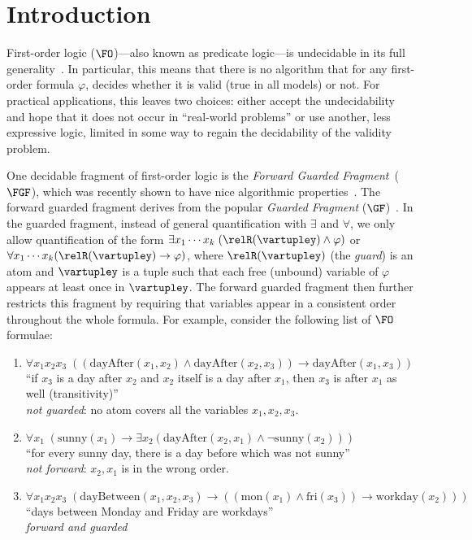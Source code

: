 \chapter{Introduction}\label{chap:introduction}

First-order logic ($\FO$)---also known as predicate logic---is undecidable in its full generality~\cite[Sec. 1.1]{borger1997}.
In particular, this means that there is no algorithm that for any first-order formula $\varphi$, decides whether it is valid (true in all models) or not.
For practical applications, this leaves two choices: either accept the undecidability and hope that it does not occur in ``real-world problems'' or use another, less expressive logic, limited in some way to regain the decidability of the validity problem.

One decidable fragment of first-order logic is the \emph{Forward Guarded Fragment}~($\FGF$), which was recently shown to have nice algorithmic properties~\cite{Bednarczyk21}.
The forward guarded fragment derives from the popular \emph{Guarded Fragment} ($\GF$)~\cite{AndrekaNB98}.
In the guarded fragment, instead of general quantification with $\exists$ and $\forall$, we only allow quantification of the form $\exists{x_{1}\cdots{}x_{k}}\; (\relR(\vartupley) \land \varphi)$ or $\forall{x_{1}\cdots{}x_{k}} (\relR(\vartupley) \to \varphi)$, where $\relR(\vartupley)$ (the \emph{guard}) is an atom and $\vartupley$ is a tuple such that each free (unbound) variable of $\varphi$ appears at least once in $\vartupley$.
The forward guarded fragment then further restricts this fragment by requiring that variables appear in a consistent order throughout the whole formula.
For example, consider the following list of $\FO$ formulae:
\begin{enumerate}
  \item $\forall{x_{1}x_{2}x_{3}}\; ((\mathrm{dayAfter}(x_{1},x_{2}) \land \mathrm{dayAfter}(x_{2},x_{3})) \to \mathrm{dayAfter}(x_{1}, x_{3}))$ \\
        ``if $x_{3}$ is a day after $x_{2}$ and $x_{2}$ itself is a day after $x_{1}$, then $x_{3}$ is after $x_{1}$ as well (transitivity)'' \\
        \emph{not guarded}: no atom covers all the variables $x_{1}, x_{2}, x_{3}$.
  \item $\forall{x_{1}}\; (\mathrm{sunny}(x_{1}) \to \exists{x_{2}} (\mathrm{dayAfter}(x_{2},x_{1}) \land \neg \mathrm{sunny}(x_{2})))$ \\
        ``for every sunny day, there is a day before which was not sunny'' \\
        \emph{not forward}: $x_{2}, x_{1}$ is in the wrong order.
  \item $\forall{x_{1}x_{2}x_{3}}\; (\mathrm{dayBetween}(x_{1},x_{2},x_{3}) \to ((\mathrm{mon}(x_{1}) \land \mathrm{fri}(x_{3})) \to \mathrm{workday}(x_{2})))$ \\
        ``days between Monday and Friday are workdays'' \\
        \emph{forward and guarded}
\end{enumerate}
